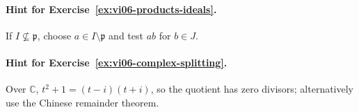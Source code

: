 \paragraph{Hint for Exercise~\ref{ex:vi06-products-ideals}.} If $I\not\subseteq\mathfrak p$, choose $a\in I\setminus\mathfrak p$ and test $ab$ for $b\in J$.

\paragraph{Hint for Exercise~\ref{ex:vi06-complex-splitting}.} Over $\mathbb C$, $t^2+1=(t-i)(t+i)$, so the quotient has zero divisors; alternatively use the Chinese remainder theorem.
